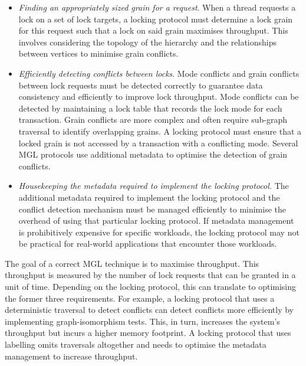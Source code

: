 \begin{itemize}

    \item[\Rb] \emph{Finding an appropriately sized grain for a request}. When a thread requests a lock on a set of lock targets, a locking protocol must determine a lock grain for this request such that a lock on said grain maximises throughput. This involves considering the topology of the hierarchy and the relationships between vertices to minimise grain conflicts.
    
    \item[\Rc] \emph{Efficiently detecting conflicts between locks}. Mode conflicts and grain conflicts between lock requests must be detected correctly to guarantee data consistency and efficiently to improve lock throughput. Mode conflicts can be detected by maintaining a lock table that records the lock mode for each transaction. Grain conflicts are more complex and often require sub-graph traversal to identify overlapping grains. A locking protocol must ensure that a locked grain is not accessed by a transaction with a conflicting mode. Several MGL protocols use additional metadata to optimise the detection of grain conflicts.

    \item[\Rd] \emph{Housekeeping the metadata required to implement the locking protocol.} The additional metadata required to implement the locking protocol and the conflict detection mechanism must be managed efficiently to minimise the overhead of using that particular locking protocol. If metadata management is prohibitively expensive for specific workloads, the locking protocol may not be practical for real-world applications that encounter those workloads. 

\end{itemize}


The goal of a correct MGL technique is to maximise throughput. This throughput is measured by the number of lock requests that can be granted in a unit of time. Depending on the locking protocol, this can translate to optimising the former three requirements. For example, a locking protocol that uses a deterministic traversal to detect conflicts can detect conflicts more efficiently by implementing graph-isomorphism tests. This, in turn, increases the system's throughput but incurs a higher memory footprint. A locking protocol that uses labelling omits traversals altogether and needs to optimise the metadata management to increase throughput. 


